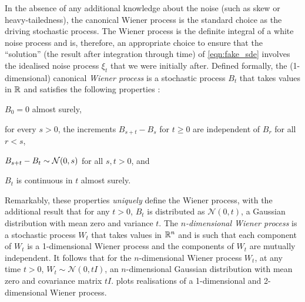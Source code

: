 In the absence of any additional knowledge about the noise (such as skew or heavy-tailedness), the canonical Wiener process is the standard choice as the driving stochastic process.
The Wiener process is the definite integral of a white noise process and is, therefore, an appropriate choice to ensure that the ``solution'' (the result after integration through time) of \cref{eqn:fake_sde} involves the idealised noise process \(\xi_t\) that we were initially after. %
Defined formally, the (1-dimensional) canonical \emph{Wiener process} is a stochastic process \(B_t\) that takes values in \(\mathbb{R}\) and satisfies the following properties \citep{KallianpurSundar_2014_StochasticAnalysisDiffusion}:
\begin{romanate}
	\item \(B_0 = 0\) almost surely,
	\item for every \(s > 0\), the increments \(B_{s + t} - B_{s}\) for \(t \geq 0\) are independent of \(B_r\) for all \(r < s\),
	\item \(B_{s + t} - B_t \sim\mathcal{N}\!\left(0, s\right)\) for all \(s,t > 0\), and
	\item \(B_t\) is continuous in \(t\) almost surely.
\end{romanate}
Remarkably, these properties \emph{uniquely} define the Wiener process, with the additional result that for any \(t > 0\), \(B_t\) is distributed as \(\mathcal{N}\left(0, t\right)\), a Gaussian distribution with mean zero and variance \(t\).
The \emph{\(n\)-dimensional Wiener process} is a stochastic process \(W_t\) that takes values in \(\mathbb{R}^n\) and is such that each component of \(W_t\) is a 1-dimensional Wiener process and the components of \(W_t\) are mutually independent.
It follows that for the \(n\)-dimensional Wiener process \(W_t\), at any time \(t > 0\), \(W_t \sim \mathcal{N}\left(0, tI\right)\), an \(n\)-dimensional Gaussian distribution with mean zero and covariance matrix \(tI\).
 plots realisations of a 1-dimensional and 2-dimensional Wiener process.

